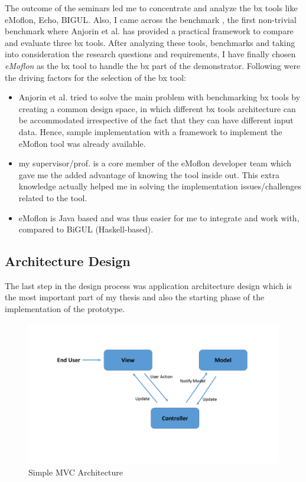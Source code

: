 The outcome of the seminars led me to concentrate and analyze the bx tools like eMoflon, Echo, BIGUL. Also, I came across the benchmark \cite{benchmarx} \cite{benchmarx-reload}, the first non-trivial benchmark where Anjorin et al. has provided a practical framework to compare and evaluate three bx tools. After analyzing these tools, benchmarks and taking into consideration the research questions and requirements, I have finally chosen \textit{eMoflon} as the bx tool to handle the bx part of the demonstrator. Following were the driving factors for the selection of the bx tool:
\begin{itemize}
	\item {Anjorin et al. \cite{benchmarx-reload} tried to solve the main problem with benchmarking bx tools by creating a common design space, in which different bx tools architecture can be accommodated irrespective of the fact that they can have different input data. Hence, sample implementation with a framework to implement the eMoflon tool was already available.}
	\item {my supervisor/prof. is a core member of the eMoflon developer team which gave me the added advantage of knowing the tool inside out. This extra knowledge actually helped me in solving the implementation issues/challenges related to the tool.}
	\item {eMoflon is Java based and was thus easier for me to integrate and work with, compared to BiGUL (Haskell-based).}
\end{itemize}

\subsection{Architecture Design}\label{subsec:architecturedesign}
The last step in the design process was application architecture design which is the most important part of my thesis and also the starting phase of the implementation of the prototype.

\begin{figure}
	\includegraphics[width=1\textwidth]{figures/MVC}
	\caption{Simple MVC Architecture}
	\label{fig:MVC}
\end{figure}


